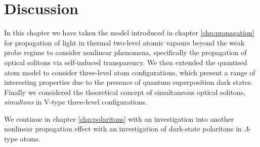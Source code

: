 \section{Discussion}
  \label{sec:nonlinear_discussion}

    In this chapter we have taken the model introduced in chapter
    \ref{chp:propagation} for propagation of light in thermal two-level atomic
    vapours beyond the weak probe regime to consider nonlinear phenomena,
    specifically the propagation of optical solitons via self-induced
    transparency. We then extended the quantised atom model to consider 
    three-level atom configurations, which present a range of interesting 
    properties due to the presence of quantum superposition dark states. Finally  
    we considered the theoretical concept of simultaneous optical solitons,
    \textit{simultons} in V-type three-level configurations.

    We continue in chapter \ref{chp:polaritons} with an investigation into
    another nonlinear propagation effect with an investigation of dark-state
    polaritons in $\Lambda$-type atoms.